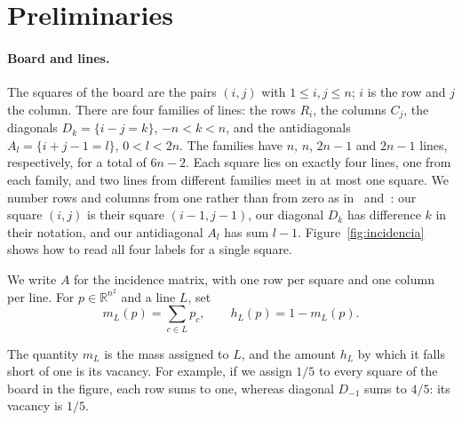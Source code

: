 \section{Preliminaries}\label{sec:preliminares}

\paragraph{Board and lines.}
The squares of the board are the pairs $(i,j)$ with $1\le i,j\le n$; $i$ is the row and $j$ the column.
There are four families of lines: the rows $R_i$, the columns $C_j$, the diagonals
$D_k=\{i-j=k\}$, $-n<k<n$, and the antidiagonals $A_l=\{i+j-1=l\}$, $0<l<2n$. The families have $n$, $n$,
$2n-1$ and $2n-1$ lines, respectively, for a total of $6n-2$. Each square lies on exactly four lines, one
from each
family, and two lines from different families meet in at most one square.
We number rows and columns from one rather than from zero as in~\cite{Perfil}
and~\cite{Completabilidad}: our square $(i,j)$ is their square $(i-1,j-1)$, our diagonal
$D_k$ has difference $k$ in their notation, and our antidiagonal $A_l$ has sum $l-1$.
Figure~\ref{fig:incidencia} shows how to read all four labels for a single square.


We write $A$ for the incidence matrix, with one row per square and one column per line.
For $p\in\mathbb R^{n^2}$ and a line $L$, set
\[
 m_L(p)=\sum_{c\in L}p_c,\qquad h_L(p)=1-m_L(p).
\]

The quantity $m_L$ is the mass assigned to $L$, and the amount $h_L$ by which it falls short of one is its
vacancy.
For example, if we assign $1/5$ to every square of the board in the figure, each row sums to one,
whereas diagonal $D_{-1}$ sums to $4/5$: its vacancy is $1/5$.

